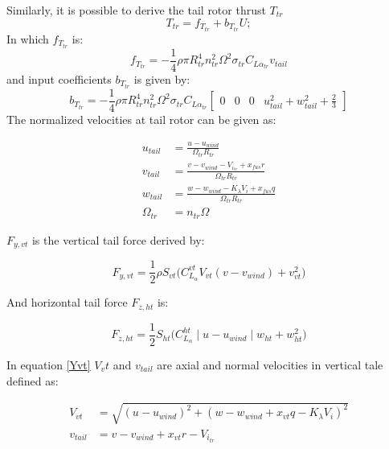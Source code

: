 Similarly, it is possible to derive the tail rotor thrust $T_{tr}$
\begin{equation}
	T_{tr} = f_{T_{tr}}+b_{T_{tr}}U;
\end{equation}
In which $f_{T_{tr}}$ is:
\begin{equation}\label{f_t_tr}
	f_{T_{tr}}=- \frac{1}{4} \rho \pi R_{tr}^4 n_{tr}^2\Omega^2\sigma_{tr}C_{L\alpha_{tr}}v_{tail}
\end{equation}
and input coefficients $b_{T_{tr}}$ is given by:
\begin{equation}\label{b_Ttr}
	b_{T_{tr}}= -\frac{1}{4} \rho \pi R_{tr}^4 n_{tr}^2 \Omega^2 \sigma_{tr} C_{L\alpha_{tr}}\begin{bmatrix}
		0&
		0&
		0&
		u_{tail}^2+w_{tail}^2+\frac{2}{3}
	\end{bmatrix}
\end{equation}
The normalized velocities at tail rotor can be given as:

\begin{equation}
	\begin{aligned}
		u_{tail}&=\frac{u-u_{wind}}{\Omega_{tr} R_{tr} }\\
		v_{tail}&=\frac{v-v_{wind}-V_{i_{tr}}+x_{fus}r}{\Omega_{tr} R_{tr}} \\
		w_{tail}&= \frac{w-w_{wind}-K_{\lambda}V_i+x_{fus}q}{\Omega_{tr} R_{tr}}\\
		\Omega_{tr}&=n_{tr}\Omega  
	\end{aligned}
\end{equation}

$F_{y,vt}$ is the vertical tail force derived by:

\begin{equation}\label{Yvt}
	F_{y,vt}=\frac{1}{2} \rho S_{vt} \Big( C_{L_\alpha}^{vt}V_{vt}(v-v_{wind})+v_{vt}^2 \Big)
\end{equation}

And horizontal tail force $F_{z,ht}$ is:

\begin{equation} \label{Z_ht}
	F_{z,ht}=\frac{1}{2} S_{ht} \Big( C_{L_{\alpha}}^{ht} \mid u-u_{wind} \mid w_{ht} +w_{ht}^2 \Big)    
\end{equation}

In equation \ref{Yvt} $V_vt$ and $v_{tail}$ are axial and normal velocities in vertical tale defined as:

\begin{equation}
	\begin{aligned}
		V_{vt}&=\sqrt{(u-u_{wind})^2+(w- w_{wind} +x_{vt}q-K_\lambda V_i)^2}\\
		v_{tail}&=v-v_{wind}+x_{vt}r-V_{i_{tr}} \\
	\end{aligned}
\end{equation}

